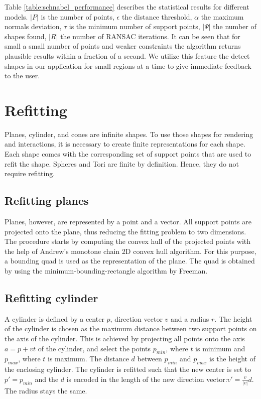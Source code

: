 Table \ref{table:schnabel_performance} describes the statistical results for different models. $|P|$ is the number of points, $\epsilon$ the distance threshold, $\alpha$ the maximum normals deviation, $\tau$ is the minimum number of support points, $|\Psi|$ the number of shapes found, $|R|$ the number of RANSAC iterations. It can be seen that for small a small number of points and weaker constraints the algorithm returns plausible results within a fraction of a second. We utilize this feature the detect shapes in our application for small regions at a time to give immediate feedback to the user. 


\section{Refitting}
\label{sec:Refitting}

Planes, cylinder, and cones are infinite shapes. To use those shapes for rendering and interactions, it is necessary to create finite representations for each shape. Each shape comes with the corresponding set of support points that are used to refit the shape. Spheres and Tori are finite by definition. Hence, they do not require refitting. 


\subsection{Refitting planes}

Planes, however, are represented by a point and a vector. All support points are projected onto the plane, thus reducing the fitting problem to two dimensions. The procedure starts by computing the convex hull of the projected points with the help of Andrew's monotone chain 2D convex hull algorithm\cite{andrew1979another}. 
For this purpose, a bounding quad is used as the representation of the plane. The quad is obtained by using the minimum-bounding-rectangle algorithm by Freeman\cite{freeman1975determining}. 


\subsection{Refitting cylinder}

A cylinder is defined by a center $p$, direction vector $v$ and a radius $r$. The height of the cylinder is chosen as the maximum distance between two support points on the axis of the cylinder. This is achieved by projecting all points onto the axis $a = p + vt$ of the cylinder, and select the points $p_{min}$, where $t$ is minimum and $p_{max}$, where $t$ is maximum. The distance $d$ between $p_{min}$ and $p_{max}$ is the height of the enclosing cylinder. The cylinder is refitted such that the new center is set to $p' = p_{min}$ and the $d$ is encoded in the length of the new direction vector:$v' = \frac{v}{|v|}d$. The radius stays the same. 


